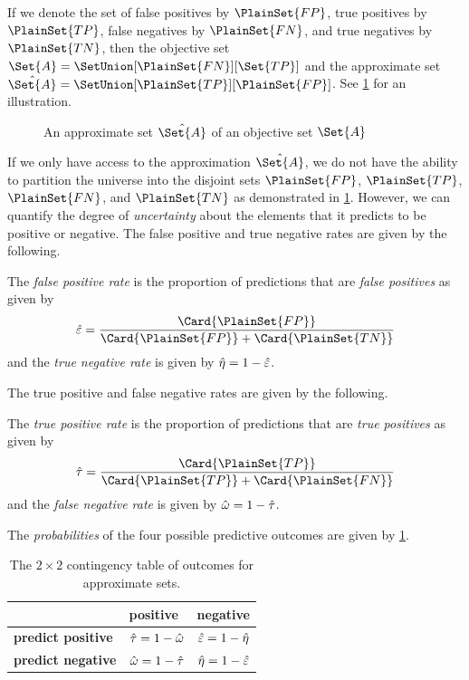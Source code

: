 \documentclass[10pt,final,hidelinks]{article}
\numberwithin{equation}{section}
\begin{document}
If we denote the set of false positives by $\PlainSet{FP}$, true positives by $\PlainSet{TP}$, false negatives by $\PlainSet{FN}$, and true negatives by $\PlainSet{TN}$, then the objective set $\Set{A}=\SetUnion[\PlainSet{FN}][\Set{TP}]$ and the approximate set $\hat{\Set{A}}=\SetUnion[\PlainSet{TP}][\PlainSet{FP}]$.
See \cref{fig:ex_approx_set} for an illustration.
\begin{figure}[ht]
	\caption{An approximate set $\hat{\Set{A}}$ of an objective set $\Set{A}$}
	\label{fig:ex_approx_set}
	\centering
	\def\svgwidth{\columnwidth/4}
	
\end{figure}

If we only have access to the approximation $\hat{\Set{A}}$, we do not have the ability to partition the universe into the disjoint sets $\PlainSet{FP}$, $\PlainSet{TP}$, $\PlainSet{FN}$, and $\PlainSet{TN}$ as demonstrated in \cref{fig:ex_approx_set}.
However, we can quantify the degree of \emph{uncertainty} about the elements that it predicts to be positive or negative.
The false positive and true negative rates are given by the following.
\begin{definition}
	\label{def:fprate}
	The \emph{false positive rate} is the proportion of predictions that are \emph{false positives} as given by
	\begin{equation}
	\hat{\fprate} = \frac{\Card{\PlainSet{FP}}}{\Card{\PlainSet{FP}} + \Card{\PlainSet{TN}}}
	\end{equation}
	and the \emph{true negative rate} is given by $\hat{\eta} = 1 - \hat{\varepsilon}$.
\end{definition}
The true positive and false negative rates are given by the following.
\begin{definition}
	The \emph{true positive rate} is the proportion of predictions that are \emph{true positives} as given by
	\begin{equation}
	\hat{\tprate} = \frac{\Card{\PlainSet{TP}}}{\Card{\PlainSet{TP}} + \Card{\PlainSet{FN}}}
	\end{equation}
	and the \emph{false negative rate} is given by $\hat{\omega} = 1 - \hat{\tau}$.
\end{definition}

The \emph{probabilities} of the four possible predictive outcomes are given by 
\cref{tbl:contingency_table}.
\begin{table}[ht]
	\centering
	\begin{tabular}{@{} l l l @{}}
		\toprule
		& \textbf{positive} & \textbf{negative}\\
		\midrule
		\textbf{predict positive} & $\hat{\tau}=1-\hat{\omega}$ & 
		$\hat{\varepsilon}=1-\hat{\eta}$\\
		\textbf{predict negative} & $\hat{\omega}=1-\hat{\tau}$ & 
		$\hat{\eta}=1-\hat{\varepsilon}$\\
		\bottomrule
	\end{tabular}
	\caption{The $2 \times 2$ contingency table of outcomes for approximate sets.}
	\label{tbl:contingency_table}        
\end{table}
\end{document}
